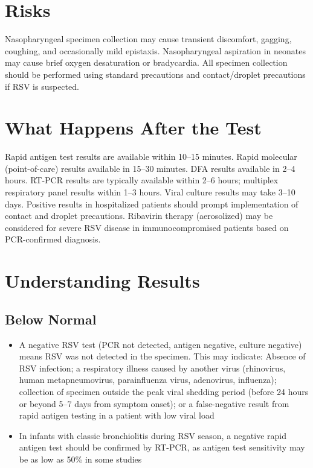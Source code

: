 \section*{Risks}
Nasopharyngeal specimen collection may cause transient discomfort, gagging, coughing, and occasionally mild epistaxis. Nasopharyngeal aspiration in neonates may cause brief oxygen desaturation or bradycardia. All specimen collection should be performed using standard precautions and contact/droplet precautions if RSV is suspected.

\section*{What Happens After the Test}
Rapid antigen test results are available within 10--15 minutes. Rapid molecular (point-of-care) results available in 15--30 minutes. DFA results available in 2--4 hours. RT-PCR results are typically available within 2--6 hours; multiplex respiratory panel results within 1--3 hours. Viral culture results may take 3--10 days. Positive results in hospitalized patients should prompt implementation of contact and droplet precautions. Ribavirin therapy (aerosolized) may be considered for severe RSV disease in immunocompromised patients based on PCR-confirmed diagnosis.

\section*{Understanding Results}

\subsection*{Below Normal}
\begin{itemize}
  \item A negative RSV test (PCR not detected, antigen negative, culture negative) means RSV was not detected in the specimen. This may indicate: Absence of RSV infection; a respiratory illness caused by another virus (rhinovirus, human metapneumovirus, parainfluenza virus, adenovirus, influenza); collection of specimen outside the peak viral shedding period (before 24 hours or beyond 5--7 days from symptom onset); or a false-negative result from rapid antigen testing in a patient with low viral load
  \item In infants with classic bronchiolitis during RSV season, a negative rapid antigen test should be confirmed by RT-PCR, as antigen test sensitivity may be as low as 50\% in some studies
\end{itemize}

